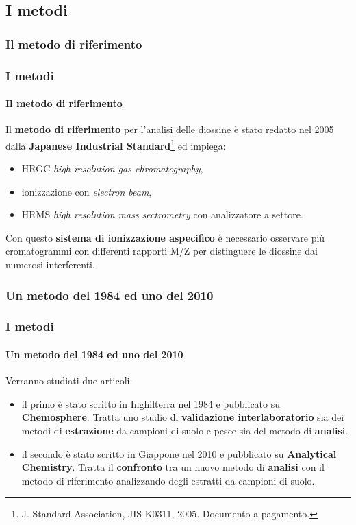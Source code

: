 \subsection{I metodi}\subsubsection{Il metodo di riferimento}\begin{frame}\frametitle{I metodi}\framesubtitle{Il metodo di riferimento}
Il {\bf metodo di riferimento} per l'analisi delle diossine è stato redatto nel 2005 dalla  {\bf  Japanese Industrial Standard}\footnote{J. Standard Association, JIS K0311, 2005. Documento a pagamento.} ed impiega:
\begin{itemize}
 \item HRGC \emph{high resolution gas chromatography},
 \item ionizzazione con \emph{electron beam},
 \item HRMS \emph{high resolution mass sectrometry} con analizzatore a settore.
\end{itemize}\pause

Con questo   {\bf sistema di ionizzazione aspecifico} è necessario osservare più cromatogrammi con differenti rapporti M/Z per distinguere le diossine dai numerosi interferenti.
\end{frame}



\subsubsection{Un metodo del 1984 ed uno del 2010}\begin{frame}\frametitle{I metodi}\framesubtitle{Un metodo del 1984 ed uno del 2010}
Verranno studiati due articoli:
\begin{itemize}
 \item il primo è stato scritto in Inghilterra nel 1984 e pubblicato su  {\bf Chemosphere}. Tratta uno studio di  {\bf validazione interlaboratorio} sia dei metodi di   {\bf estrazione} da campioni di suolo e pesce sia del metodo di   {\bf analisi}. \cite{1984}\pause
 \item il secondo è stato scritto in Giappone nel 2010 e pubblicato su  {\bf Analytical Chemistry}. Tratta il   {\bf confronto} tra un nuovo metodo di   {\bf analisi} con il metodo di riferimento analizzando degli estratti da campioni di suolo. \cite{2010}
\end{itemize}

                                  \end{frame}


